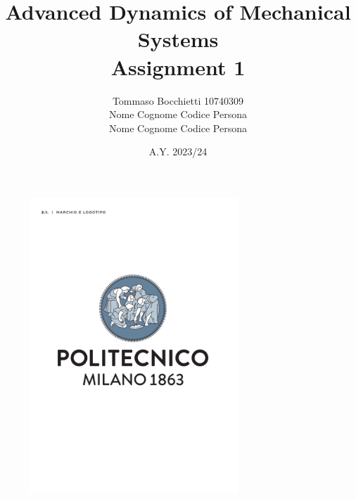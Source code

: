 \documentclass{assignment}
\begin{document}
\title{Advanced Dynamics of Mechanical Systems \\ Assignment 1}
\author{Tommaso Bocchietti 10740309 \\ Nome Cognome Codice Persona \\ Nome Cognome Codice Persona}
\date{A.Y. 2023/24}

\maketitle

\begin{figure}[H]
    \centering
    \includegraphics[width=0.7\textwidth]{./pdf/Polimi_logo_coverpage.pdf}
    \label{fig:Polimi_logo}
\end{figure}

\clearpage
\tableofcontents
\listoffigures
\listoftables
\lstlistoflistings
\printglossary[type=\acronymtype]

\clearpage






\clearpage






% 
% 
\end{document}
